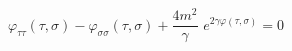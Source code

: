 \begin{equation}\label{Liouville-equation}
\varphi_{\tau\tau}(\tau,\sigma) 
-\varphi_{\sigma\sigma}(\tau,\sigma)
+\frac{4m^2}{\gamma}\,\, e^{2\gamma\varphi(\tau,\sigma)}=0
\end{equation} 
